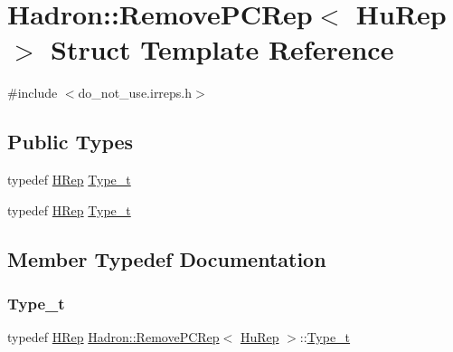 \hypertarget{structHadron_1_1RemovePCRep_3_01HuRep_01_4}{}\section{Hadron\+:\+:Remove\+P\+C\+Rep$<$ Hu\+Rep $>$ Struct Template Reference}
\label{structHadron_1_1RemovePCRep_3_01HuRep_01_4}


{\ttfamily \#include $<$do\+\_\+not\+\_\+use.\+irreps.\+h$>$}

\subsection*{Public Types}
\begin{DoxyCompactItemize}
\item 
typedef \mbox{\hyperlink{structHadron_1_1HRep}{H\+Rep}} \mbox{\hyperlink{structHadron_1_1RemovePCRep_3_01HuRep_01_4_a522cd18fd592a05606e8538a3e693d3e}{Type\+\_\+t}}
\item 
typedef \mbox{\hyperlink{structHadron_1_1HRep}{H\+Rep}} \mbox{\hyperlink{structHadron_1_1RemovePCRep_3_01HuRep_01_4_a522cd18fd592a05606e8538a3e693d3e}{Type\+\_\+t}}
\end{DoxyCompactItemize}


\subsection{Member Typedef Documentation}
\mbox{\label{structHadron_1_1RemovePCRep_3_01HuRep_01_4_a522cd18fd592a05606e8538a3e693d3e}} 
\subsubsection{\texorpdfstring{Type\_t}{Type\_t}\hspace{0.1cm}{\footnotesize\ttfamily [1/2]}}
{\footnotesize\ttfamily typedef \mbox{\hyperlink{structHadron_1_1HRep}{H\+Rep}} \mbox{\hyperlink{structHadron_1_1RemovePCRep}{Hadron\+::\+Remove\+P\+C\+Rep}}$<$ \mbox{\hyperlink{structHadron_1_1HuRep}{Hu\+Rep}} $>$\+::\mbox{\hyperlink{structHadron_1_1RemovePCRep_3_01HuRep_01_4_a522cd18fd592a05606e8538a3e693d3e}{Type\+\_\+t}}}

\mbox{\label{structHadron_1_1RemovePCRep_3_01HuRep_01_4_a522cd18fd592a05606e8538a3e693d3e}} 
